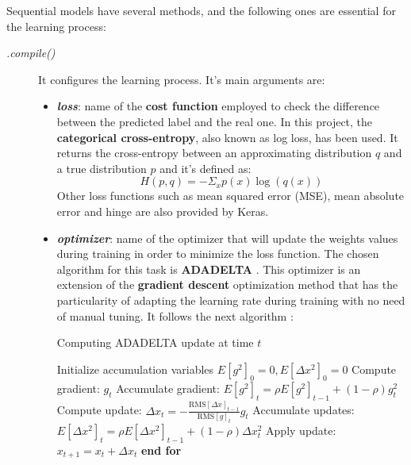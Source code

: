 Sequential models have several methods, and the following ones are essential for the learning process:
\begin{description}
	\item[\textit{.compile()}] It configures the learning process. It's main arguments are:
	\begin{itemize}
		\item \textbf{\textit{loss}}: name of the \textbf{cost function} employed to check the difference between the predicted label and the real one. In this project, the \textbf{categorical cross-entropy}, also known as log loss, has been used. It returns the cross-entropy between an approximating distribution $q$ and a true distribution $p$ \cite{2016arXiv160502688short} and it's defined as:
		\begin{equation}\label{eq:categorical_crossentropy}
		H(p,q)=-\Sigma_{x}p(x)\log(q(x))
		\end{equation}		
		Other loss functions such as mean squared error (MSE), mean absolute error and hinge are also provided by Keras.
		
		\item \textbf{\textit{optimizer}}: name of the optimizer that will update the weights values during training in order to minimize the loss function. The chosen algorithm for this task is \textbf{ADADELTA} \cite{DBLP:journals/corr/abs-1212-5701}. This optimizer is an extension of the \textbf{gradient descent} optimization method that has the particularity of adapting the learning rate during training with no need of manual tuning. It follows the next algorithm \cite{DBLP:journals/corr/abs-1212-5701}:
		
		\begin{minipage}{\linewidth}
		\begin{algorithm}[H]
			\caption{Computing ADADELTA update at time $t$}\label{adadelta}
		  	\begin{algorithmic}[1]
		  		\State Initialize accumulation variables $E[g^2]_0=0, E[\Delta x^2]_0 = 0$
		  		 
		  		\State Compute gradient: $g_t$
		  		\State Accumulate gradient: $E[g^2]_t=\rho E[g^2]_{t-1}+(1-\rho)g_t^2$
		  		\State Compute update: $\Delta x_t=-\frac{\mathrm{RMS}[\Delta x]_{t-1}}{\mathrm{RMS}[g]_t}g_t$
		  		\State Accumulate updates: $E[\Delta x^2]_t=\rho E[\Delta x^2]_{t-1}+(1-\rho)\Delta x_t^2$
		  		\State Apply update: $x_{t+1}=x_t+\Delta x_t$
				\EndFor
		  		\State \textbf{end for}
		  	\end{algorithmic}
		\end{algorithm}
		\end{minipage}\\
				

\end{itemize}
\end{description}
